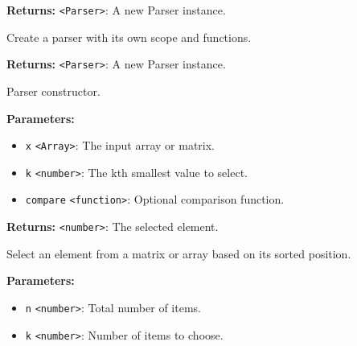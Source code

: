 \documentclass[12pt,a4paper]{article}
\begin{document}
\vspace{5mm}
\noindent {}


\noindent \textbf{Returns:} \texttt{<Parser>}: A new Parser instance.

\noindent Create a parser with its own scope and functions.

\vspace{5mm}
\noindent {}


\noindent \textbf{Returns:} \texttt{<Parser>}: A new Parser instance.

\noindent Parser constructor.

\vspace{5mm}
\noindent {}


\noindent \textbf{Parameters:}
\begin{itemize}
  \item \texttt{x} \texttt{<Array>}: The input array or matrix.
  \item \texttt{k} \texttt{<number>}: The kth smallest value to select.
  \item \texttt{compare} \texttt{<function>}: Optional comparison function.
\end{itemize}

\noindent \textbf{Returns:} \texttt{<number>}: The selected element.

\noindent Select an element from a matrix or array based on its sorted position.

\vspace{5mm}
\noindent {}


\noindent \textbf{Parameters:}
\begin{itemize}
  \item \texttt{n} \texttt{<number>}: Total number of items.
  \item \texttt{k} \texttt{<number>}: Number of items to choose.
\end{itemize}
\end{document}
